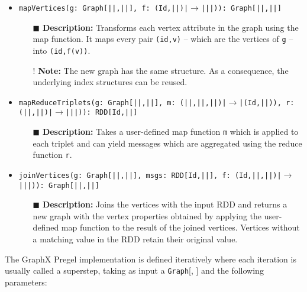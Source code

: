 \begin{itemize}
    \setlength\itemsep{1em}
    \item \texttt{mapVertices(g: Graph[|\VertSet|,|\EdgeSet|], f: (Id,|\VertSet|)|$\rightarrow$||\VertSet|)): Graph[|\VertSet|,|\EdgeSet|]}
          \begin{itemize}
              \item[$\blacksquare$] \textbf{Description:} Transforms each vertex attribute in the graph using the map function. It maps every pair \texttt{(id,v)} -- which are the vertices of \texttt{g} -- into \texttt{(id,f(v))}.
              \item[!] \textbf{Note:} The new graph has the same structure. As a consequence, the underlying index structures can be reused.
          \end{itemize}
    \item \texttt{mapReduceTriplets(g: Graph[|\VertSet|,|\EdgeSet|], m: (|\VertSet|,|\EdgeSet|,|\VertSet|)|$\rightarrow$|(Id,|\MsgSet|)), r: (|\MsgSet|,|\MsgSet|)|$\rightarrow$||\MsgSet|)): RDD[Id,|\MsgSet|]}
          \begin{itemize}
              \item[$\blacksquare$] \textbf{Description:} Takes a user-defined map function \texttt{m} which is applied to each triplet and can yield messages which are aggregated using the reduce function \texttt{r}.
          \end{itemize}
    \item \texttt{joinVertices(g: Graph[|\VertSet|,|\EdgeSet|], msgs: RDD[Id,|\MsgSet|], f: (Id,|\VertSet|,|\MsgSet|)|$\rightarrow$||\VertSet|)): Graph[|\VertSet|,|\EdgeSet|]}
          \begin{itemize}
              \item[$\blacksquare$] \textbf{Description:} Joins the vertices with the input RDD and returns a new graph with the vertex properties obtained by applying the user-defined map function to the result of the joined vertices. Vertices without a matching value in the RDD retain their original value.
          \end{itemize}
\end{itemize}

The GraphX Pregel implementation is defined iteratively where each iteration is usually called a superstep, taking as input a \texttt{Graph}[\VertSet, \EdgeSet] and the following parameters:

